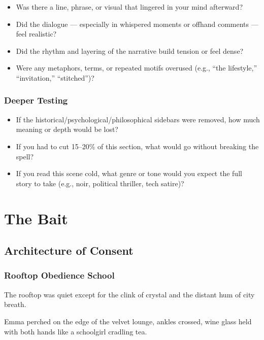 \begin{itemize}
\item Was there a line, phrase, or visual that lingered in your mind afterward?
\item Did the dialogue — especially in whispered moments or offhand comments — feel realistic?
\item Did the rhythm and layering of the narrative build tension or feel dense?
\item Were any metaphors, terms, or repeated motifs overused (e.g., “the lifestyle,” “invitation,” “stitched”)?
\end{itemize}

\subsubsection{Deeper Testing}

\begin{itemize}
\item If the historical/psychological/philosophical sidebars were removed, how much meaning or depth would be lost?
\item If you had to cut 15–20\% of this section, what would go without breaking the spell?
\item If you read this scene cold, what genre or tone would you expect the full story to take (e.g., noir, political thriller, tech satire)?
\end{itemize}









\section{The Bait}

\subsection{Architecture of Consent}

\subsubsection{Rooftop Obedience School}

The rooftop was quiet except for the clink of crystal and the distant hum of city breath.

Emma perched on the edge of the velvet lounge, ankles crossed, wine glass held with both 
hands like a schoolgirl cradling tea.


